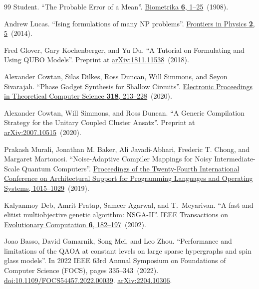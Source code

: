 \documentclass[a4paper,onecolumn,11pt,unpublished]{quantumarticle}
\theoremstyle{remark}
\begin{document}
\begin{thebibliography}{99}
Student.
\newblock ``The Probable Error of a Mean''.
\newblock \href{https://doi.org/10.2307/2331554}{Biometrika {\bf 6}, 1--25}~(1908).


Andrew Lucas.
\newblock ``Ising formulations of many NP problems''.
\newblock \href{https://doi.org/10.3389/fphy.2014.00005}{Frontiers in Physics {\bf 2}, 5}~(2014).


Fred Glover, Gary Kochenberger, and Yu Du.
\newblock ``A Tutorial on Formulating and Using QUBO Models''.
\newblock Preprint at \href{https://arxiv.org/abs/1811.11538}{arXiv:1811.11538}~(2018).


Alexander Cowtan, Silas Dilkes, Ross Duncan, Will Simmons, and Seyon Sivarajah.
\newblock ``Phase Gadget Synthesis for Shallow Circuits''.
\newblock \href{https://doi.org/10.4204/eptcs.318.13}{Electronic Proceedings in Theoretical Computer Science {\bf 318}, 213--228}~(2020).


Alexander Cowtan, Will Simmons, and Ross Duncan.
\newblock ``A Generic Compilation Strategy for the Unitary Coupled Cluster Ansatz''.
\newblock Preprint at \href{https://arxiv.org/abs/2007.10515}{arXiv:2007.10515}~(2020).


Prakash Murali, Jonathan M. Baker, Ali Javadi-Abhari, Frederic T. Chong, and Margaret Martonosi.
\newblock ``Noise-Adaptive Compiler Mappings for Noisy Intermediate-Scale Quantum Computers''.
\newblock \href{https://doi.org/10.1145/3297858.3304075}{Proceedings of the Twenty-Fourth International Conference on Architectural Support for Programming Languages and Operating Systems, 1015--1029}~(2019).


Kalyanmoy Deb, Amrit Pratap, Sameer Agarwal, and T.~Meyarivan.
\newblock ``A fast and elitist multiobjective genetic algorithm: NSGA-II''.
\newblock \href{https://dx.doi.org/10.1109/4235.996017}{IEEE Transactions on Evolutionary Computation {\bf 6}, 182--197}~(2002).

Joao Basso, David Gamarnik, Song Mei, and Leo Zhou.
\newblock ``Performance and limitations of the QAOA at constant levels on large sparse hypergraphs and spin glass models''.
\newblock In 2022 IEEE 63rd Annual Symposium on Foundations of Computer Science (FOCS), pages 335--343~(2022).
\newblock \href{https://dx.doi.org/10.1109/FOCS54457.2022.00039}{doi:10.1109/FOCS54457.2022.00039}.
\newblock \href{http://arxiv.org/abs/2204.10306}{arXiv:2204.10306}.


\end{thebibliography}
\end{document}
